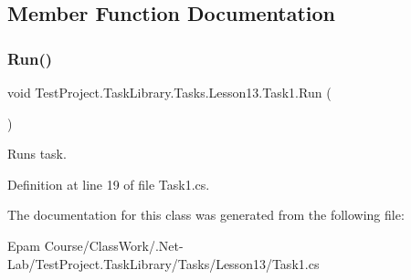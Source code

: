 \subsection{Member Function Documentation}
\mbox{\label{class_test_project_1_1_task_library_1_1_tasks_1_1_lesson13_1_1_task1_a9b742ee600c6244e0aebc1896b4f88a5}} 
\subsubsection{\texorpdfstring{Run()}{Run()}}
{\footnotesize\ttfamily void Test\+Project.\+Task\+Library.\+Tasks.\+Lesson13.\+Task1.\+Run (\begin{DoxyParamCaption}{ }\end{DoxyParamCaption})}



Runs task. 



Definition at line 19 of file Task1.\+cs.



The documentation for this class was generated from the following file\+:\begin{DoxyCompactItemize}
\item 
Epam Course/\+Class\+Work/.\+Net-\/\+Lab/\+Test\+Project.\+Task\+Library/\+Tasks/\+Lesson13/Task1.\+cs\end{DoxyCompactItemize}

